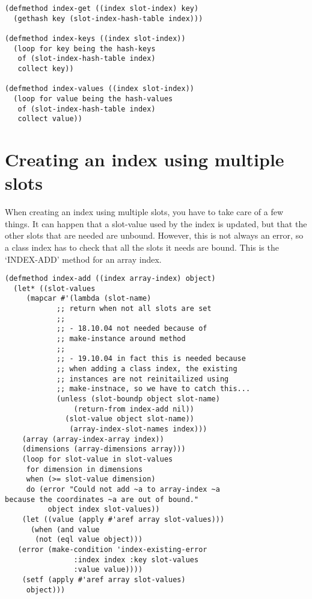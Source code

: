 \begin{Verbatim}[fontsize=\small,frame=leftline,framerule=0.9mm,rulecolor=\color{gray},framesep=5.1mm,xleftmargin=5mm,fontfamily=cmtt]
(defmethod index-get ((index slot-index) key)
  (gethash key (slot-index-hash-table index)))

(defmethod index-keys ((index slot-index))
  (loop for key being the hash-keys
   of (slot-index-hash-table index)
   collect key))

(defmethod index-values ((index slot-index))
  (loop for value being the hash-values
   of (slot-index-hash-table index)
   collect value))
\end{Verbatim}


\section{ Creating an index using multiple slots}

When creating an index using multiple slots, you have to take care
of a few things. It can happen that a slot-value used by the index
is updated, but that the other slots that are needed are
unbound. However, this is not always an error, so a class index
has to check that all the slots it needs are bound. This is the
`INDEX-ADD' method for an array index.

\begin{Verbatim}[fontsize=\small,frame=leftline,framerule=0.9mm,rulecolor=\color{gray},framesep=5.1mm,xleftmargin=5mm,fontfamily=cmtt]
(defmethod index-add ((index array-index) object)
  (let* ((slot-values
     (mapcar #'(lambda (slot-name)
            ;; return when not all slots are set
            ;;
            ;; - 18.10.04 not needed because of
            ;; make-instance around method
            ;;
            ;; - 19.10.04 in fact this is needed because
            ;; when adding a class index, the existing
            ;; instances are not reinitailized using
            ;; make-instnace, so we have to catch this...
            (unless (slot-boundp object slot-name)
                (return-from index-add nil))
              (slot-value object slot-name))
               (array-index-slot-names index)))
    (array (array-index-array index))
    (dimensions (array-dimensions array)))
    (loop for slot-value in slot-values
     for dimension in dimensions
     when (>= slot-value dimension)
     do (error "Could not add ~a to array-index ~a
because the coordinates ~a are out of bound."
          object index slot-values))
    (let ((value (apply #'aref array slot-values)))
      (when (and value
       (not (eql value object)))
   (error (make-condition 'index-existing-error
                :index index :key slot-values
                :value value))))
    (setf (apply #'aref array slot-values)
     object)))
\end{Verbatim}
